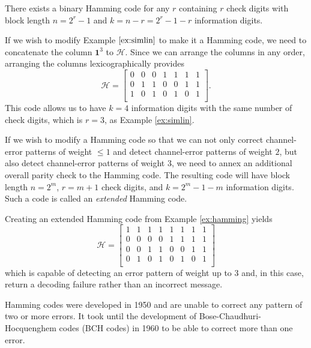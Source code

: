 There exists a binary Hamming code for any $r$ containing $r$ check digits with block length $n = 2^r - 1$ and $k = n - r = 2^r - 1 - r$ information digits.

\begin{example}\label{ex:hamming}
    If we wish to modify Example $\ref{ex:simlin}$ to make it a Hamming code, we need to concatenate the column $\textbf{1}^3$ to $\mathscr{H}$. Since we can arrange the columns in any order, arranging the columns lexicographically provides
    \[
        \mathscr{H} = 
        \left[\begin{array}{ccccccc}
            0 & 0 & 0 & 1 & 1 & 1 & 1\\
            0 & 1 & 1 & 0 & 0 & 1 & 1\\
            1 & 0 & 1 & 0 & 1 & 0 & 1\\
        \end{array}\right].
    \]
    This code allows us to have $k = 4$ information digits with the same number of check digits, which is $r = 3$, as Example \ref{ex:simlin}.
\end{example}

If we wish to modify a Hamming code so that we can not only correct channel-error patterns of weight $\leq 1$ and detect channel-error patterns of weight $2$, but also detect channel-error patterns of weight 3, we need to annex an additional overall parity check to the Hamming code. The resulting code will have block length $n = 2^m$, $r = m + 1$ check digits, and $k = 2^m - 1 - m$ information digits. Such a code is called an \textit{extended} Hamming code.

\begin{example}\label{ex:extendedhamming}
    Creating an extended Hamming code from Example \ref{ex:hamming} yields
    \[
        \mathscr{H} = 
        \left[\begin{array}{cccccccc}
            1 & 1 & 1 & 1 & 1 & 1 & 1 & 1\\
            0 & 0 & 0 & 0 & 1 & 1 & 1 & 1\\
            0 & 0 & 1 & 1 & 0 & 0 & 1 & 1\\
            0 & 1 & 0 & 1 & 0 & 1 & 0 & 1\\
        \end{array}\right]
    \]
    which is capable of detecting an error pattern of weight up to 3 and, in this case, return a decoding failure rather than an incorrect message.
\end{example}

Hamming codes were developed in 1950 and are unable to correct any pattern of two or more errors. It took until the development of Bose-Chaudhuri-Hocquenghem codes (BCH codes) in 1960 to be able to correct more than one error.

